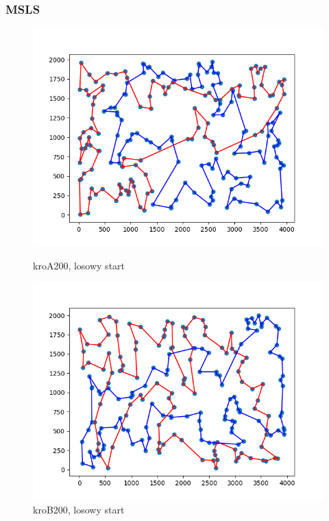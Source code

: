 \documentclass[11pt]{article}
\begin{document}
\subsubsection{MSLS}
\begin{figure}[H]
    \begin{minipage}[t]{0.45\textwidth}
        \centering
        \includegraphics[width=\linewidth]{best_paths/kroA200/MSLS}
        \caption{kroA200, losowy start}
    \end{minipage}
    \hfill
    \begin{minipage}[t]{0.45\textwidth}
        \centering
        \includegraphics[width=\linewidth]{best_paths/kroB200/MSLS}
        \caption{kroB200, losowy start}
    \end{minipage}\label{fig:figure3}
\end{figure}
\end{document}
